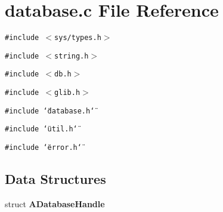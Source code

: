 \section{database.c File Reference}
\label{database_8c}
{\tt \#include $<$sys/types.h$>$}\par
{\tt \#include $<$string.h$>$}\par
{\tt \#include $<$db.h$>$}\par
{\tt \#include $<$glib.h$>$}\par
{\tt \#include \char`\"{}database.h\char`\"{}}\par
{\tt \#include \char`\"{}util.h\char`\"{}}\par
{\tt \#include \char`\"{}error.h\char`\"{}}\par
\subsection*{Data Structures}
\begin{CompactItemize}
\item 
struct {\bf ADatabase\-Handle}
\end{CompactItemize}
